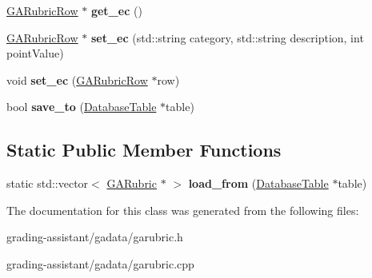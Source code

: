 \begin{DoxyCompactItemize}
\item 
\mbox{\label{class_g_a_rubric_a7fcc45b5adcc76d3ba11eb1a3189553c}} 
\hyperlink{class_g_a_rubric_row}{G\+A\+Rubric\+Row} $\ast$ {\bfseries get\+\_\+ec} ()
\item 
\mbox{\label{class_g_a_rubric_aa4b476559c0c28086da6393c74fd2a57}} 
\hyperlink{class_g_a_rubric_row}{G\+A\+Rubric\+Row} $\ast$ {\bfseries set\+\_\+ec} (std\+::string category, std\+::string description, int point\+Value)
\item 
\mbox{\label{class_g_a_rubric_a35176e486e148314b02890ed00986f9b}} 
void {\bfseries set\+\_\+ec} (\hyperlink{class_g_a_rubric_row}{G\+A\+Rubric\+Row} $\ast$row)
\item 
\mbox{\label{class_g_a_rubric_a9999dba278704374dd8326892257c351}} 
bool {\bfseries save\+\_\+to} (\hyperlink{class_database_table}{Database\+Table} $\ast$table)
\end{DoxyCompactItemize}
\subsection*{Static Public Member Functions}
\begin{DoxyCompactItemize}
\item 
\mbox{\label{class_g_a_rubric_ac7180d84cb7943e26f90bc43b9c19d03}} 
static std\+::vector$<$ \hyperlink{class_g_a_rubric}{G\+A\+Rubric} $\ast$ $>$ {\bfseries load\+\_\+from} (\hyperlink{class_database_table}{Database\+Table} $\ast$table)
\end{DoxyCompactItemize}


The documentation for this class was generated from the following files\+:\begin{DoxyCompactItemize}
\item 
grading-\/assistant/gadata/garubric.\+h\item 
grading-\/assistant/gadata/garubric.\+cpp\end{DoxyCompactItemize}
